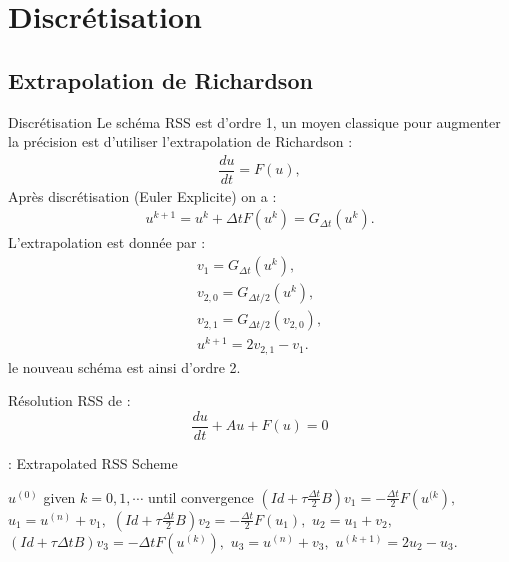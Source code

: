 \documentclass[11pt]{beamer}
\begin{document}
\section{Discrétisation}
\subsection{Extrapolation de Richardson}
\begin{frame}{Discrétisation}
Le schéma RSS est d'ordre 1, un moyen classique pour augmenter la précision est d'utiliser l'extrapolation de Richardson :
\begin{eqnarray*}
\dfrac{d u }{dt}=F(u),
\end{eqnarray*}
Après discrétisation (Euler Explicite) on a :
\begin{eqnarray*}
u^{k+1}=u^{k}+\Delta t F(u^k)=G_{\Delta t}(u^k).
\end{eqnarray*}
L'extrapolation est donnée par :
\begin{eqnarray*}
v_1=G_{\Delta t}(u^k),\\
v_{2,0}=G_{\Delta t /2}(u^k),\\
v_{2,1}=G_{\Delta t /2}(v_{2,0}),\\
u^{k+1}=2v_{2,1}-v_1.
\end{eqnarray*}
le nouveau schéma est ainsi d'ordre 2.
\end{frame}
%
 \begin{frame}
 Résolution RSS de :
 \begin{equation}
 \frac{du}{dt}+Au+F(u)=0
 \end{equation}
 
 \begin{center}
\begin{minipage}[H]{12cm}
  \begin{algorithm}[H]
    \caption{: Extrapolated RSS Scheme}\label{ExtraRSS}
    \begin{algorithmic}[1]
        \State $u^{(0)}$ given
            \For $k=0,1, \cdots$ until convergence
              $ (Id+\tau \frac{\Delta t}{2}B) v_1=-\frac{\Delta t}{2} F(u^{(k}),$
               $u_1=u^{(n)} +v_1,$
                $ (Id+\tau \frac{\Delta t}{2}B) v_2=-\frac{\Delta t}{2} F(u_1),$
                $u_2=u_1+v_2,$
                $(Id+\tau \Delta tB) v_3=-\Delta t  F(u^{(k)}),$
                $u_3=u^{(n)}+v_3,$
                 $u^{(k+1)}=2u_2-u_3.$              
            \EndFor
    \end{algorithmic}
    \end{algorithm}
\end{minipage}
\end{center}
 \end{frame}
\end{document}

